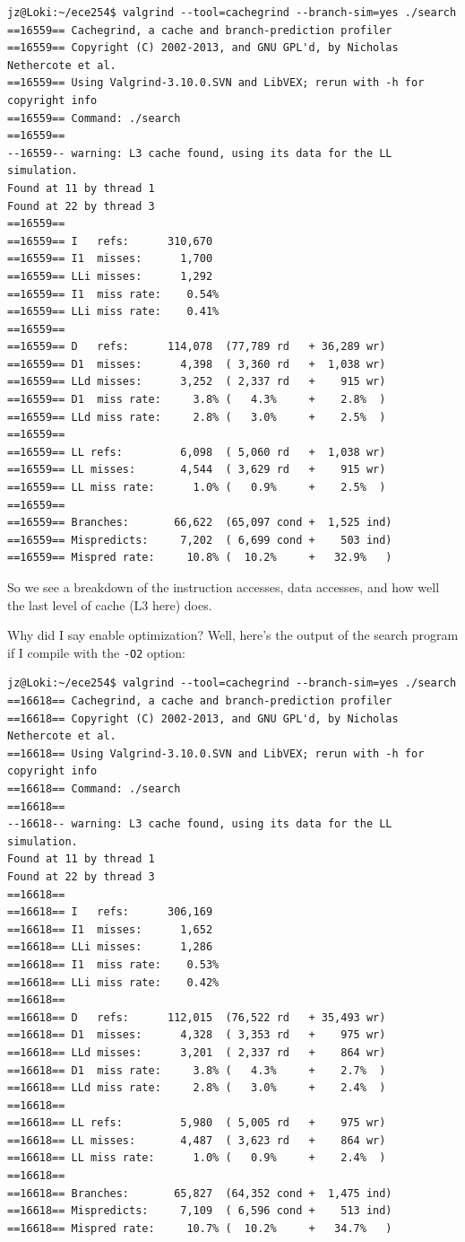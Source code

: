\documentclass[a4paper]{report}
\begin{document}
\begin{verbatim}
jz@Loki:~/ece254$ valgrind --tool=cachegrind --branch-sim=yes ./search
==16559== Cachegrind, a cache and branch-prediction profiler
==16559== Copyright (C) 2002-2013, and GNU GPL'd, by Nicholas Nethercote et al.
==16559== Using Valgrind-3.10.0.SVN and LibVEX; rerun with -h for copyright info
==16559== Command: ./search
==16559== 
--16559-- warning: L3 cache found, using its data for the LL simulation.
Found at 11 by thread 1 
Found at 22 by thread 3 
==16559== 
==16559== I   refs:      310,670
==16559== I1  misses:      1,700
==16559== LLi misses:      1,292
==16559== I1  miss rate:    0.54%
==16559== LLi miss rate:    0.41%
==16559== 
==16559== D   refs:      114,078  (77,789 rd   + 36,289 wr)
==16559== D1  misses:      4,398  ( 3,360 rd   +  1,038 wr)
==16559== LLd misses:      3,252  ( 2,337 rd   +    915 wr)
==16559== D1  miss rate:     3.8% (   4.3%     +    2.8%  )
==16559== LLd miss rate:     2.8% (   3.0%     +    2.5%  )
==16559== 
==16559== LL refs:         6,098  ( 5,060 rd   +  1,038 wr)
==16559== LL misses:       4,544  ( 3,629 rd   +    915 wr)
==16559== LL miss rate:      1.0% (   0.9%     +    2.5%  )
==16559== 
==16559== Branches:       66,622  (65,097 cond +  1,525 ind)
==16559== Mispredicts:     7,202  ( 6,699 cond +    503 ind)
==16559== Mispred rate:     10.8% (  10.2%     +   32.9%   )

\end{verbatim}

So we see a breakdown of the instruction accesses, data accesses, and how well the last level of cache (L3 here) does. 

Why did I say enable optimization? Well, here's the output of the search program if I compile with the \texttt{-O2} option:

\begin{verbatim}
jz@Loki:~/ece254$ valgrind --tool=cachegrind --branch-sim=yes ./search
==16618== Cachegrind, a cache and branch-prediction profiler
==16618== Copyright (C) 2002-2013, and GNU GPL'd, by Nicholas Nethercote et al.
==16618== Using Valgrind-3.10.0.SVN and LibVEX; rerun with -h for copyright info
==16618== Command: ./search
==16618== 
--16618-- warning: L3 cache found, using its data for the LL simulation.
Found at 11 by thread 1 
Found at 22 by thread 3 
==16618== 
==16618== I   refs:      306,169
==16618== I1  misses:      1,652
==16618== LLi misses:      1,286
==16618== I1  miss rate:    0.53%
==16618== LLi miss rate:    0.42%
==16618== 
==16618== D   refs:      112,015  (76,522 rd   + 35,493 wr)
==16618== D1  misses:      4,328  ( 3,353 rd   +    975 wr)
==16618== LLd misses:      3,201  ( 2,337 rd   +    864 wr)
==16618== D1  miss rate:     3.8% (   4.3%     +    2.7%  )
==16618== LLd miss rate:     2.8% (   3.0%     +    2.4%  )
==16618== 
==16618== LL refs:         5,980  ( 5,005 rd   +    975 wr)
==16618== LL misses:       4,487  ( 3,623 rd   +    864 wr)
==16618== LL miss rate:      1.0% (   0.9%     +    2.4%  )
==16618== 
==16618== Branches:       65,827  (64,352 cond +  1,475 ind)
==16618== Mispredicts:     7,109  ( 6,596 cond +    513 ind)
==16618== Mispred rate:     10.7% (  10.2%     +   34.7%   )
\end{verbatim}
\end{document}
